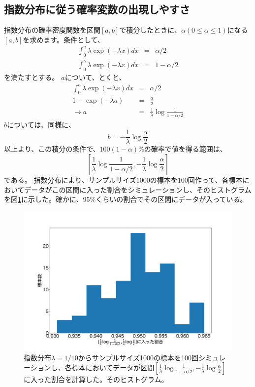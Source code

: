 \subsection{指数分布に従う確率変数の出現しやすさ}
指数分布の確率密度関数を区間$[a,b]$で積分したときに、$\alpha(0\leq \alpha \leq 1)$になる$[a,b]$を求めます。条件として、
\begin{eqnarray*}
    \int_0^{a}  \lambda\exp(-\lambda x )dx &=& \alpha/2\\
    \int_0^{b} \lambda\exp(-\lambda x )dx &=& 1-\alpha/2
\end{eqnarray*}
を満たすとする。
$a$について、とくと、
\begin{eqnarray*}
    \int_0^{a}  \lambda\exp(-\lambda x )dx &=& \alpha/2\\
     1-\exp(-\lambda a) &=& \frac{\alpha}{2}\\
     \rightarrow a&=& \frac{1}{\lambda} \log\frac{1}{1-\alpha/2}
\end{eqnarray*}
$b$については、同様に、
\begin{equation*}
    b = -\frac{1}{\lambda}\log\frac{\alpha}{2}
\end{equation*}
以上より、この積分の条件で、$100(1-\alpha)\%$の確率で値を得る範囲は、
\begin{equation}\label{expon_fail_prediction_interval}
 [\frac{1}{\lambda} \log\frac{1}{1-\alpha/2},
-\frac{1}{\lambda}\log\frac{\alpha}{2}]
\end{equation}
である。
指数分布により、サンプルサイズ$1000$の標本を$100$回作って、各標本においてデータがこの区間に入った割合をシミュレーションし、そのヒストグラムを図\ref{fig:expon_simulation_sample}に示した。確かに、$95\%$くらいの割合でその区間にデータが入っている。

\begin{figure}
    \begin{center}
        \includegraphics[width=15cm]{./image/02_/expon_simulation_sample.pdf}
        \caption{指数分布$\lambda=1/10$からサンプルサイズ1000の標本を100回シミュレーションし、各標本においてデータが区間$[\frac{1}{\lambda} \log\frac{1}{1-\alpha/2} ,-\frac{1}{\lambda}\log\frac{\alpha}{2}]$に入った割合を計算した。そのヒストグラム。}
        \label{fig:expon_simulation_sample}

    \end{center}
\end{figure}


